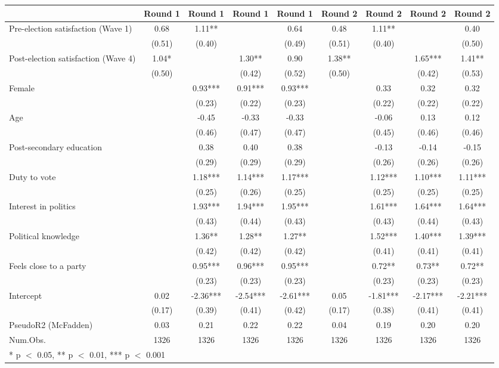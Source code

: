 \begin{table}
\centering
\begin{tabular}[t]{lcccccccc}
\toprule
  & Round 1 & Round 1  & Round 1   & Round 1    & Round 2 & Round 2  & Round 2   & Round 2   \\
\midrule
Pre-election satisfaction (Wave 1) & 0.68 & 1.11** &  & 0.64 & 0.48 & 1.11** &  & 0.40\\
 & (0.51) & (0.40) &  & (0.49) & (0.51) & (0.40) &  & (0.50)\\
Post-election satisfaction (Wave 4) & 1.04* &  & 1.30** & 0.90 & 1.38** &  & 1.65*** & 1.41**\\
 & (0.50) &  & (0.42) & (0.52) & (0.50) &  & (0.42) & (0.53)\\
Female &  & 0.93*** & 0.91*** & 0.93*** &  & 0.33 & 0.32 & 0.32\\
 &  & (0.23) & (0.22) & (0.23) &  & (0.22) & (0.22) & (0.22)\\
Age &  & -0.45 & -0.33 & -0.33 &  & -0.06 & 0.13 & 0.12\\
 &  & (0.46) & (0.47) & (0.47) &  & (0.45) & (0.46) & (0.46)\\
Post-secondary education &  & 0.38 & 0.40 & 0.38 &  & -0.13 & -0.14 & -0.15\\
 &  & (0.29) & (0.29) & (0.29) &  & (0.26) & (0.26) & (0.26)\\
Duty to vote &  & 1.18*** & 1.14*** & 1.17*** &  & 1.12*** & 1.10*** & 1.11***\\
 &  & (0.25) & (0.26) & (0.25) &  & (0.25) & (0.25) & (0.25)\\
Interest in politics &  & 1.93*** & 1.94*** & 1.95*** &  & 1.61*** & 1.64*** & 1.64***\\
 &  & (0.43) & (0.44) & (0.43) &  & (0.43) & (0.44) & (0.43)\\
Political knowledge &  & 1.36** & 1.28** & 1.27** &  & 1.52*** & 1.40*** & 1.39***\\
 &  & (0.42) & (0.42) & (0.42) &  & (0.41) & (0.41) & (0.41)\\
Feels close to a party &  & 0.95*** & 0.96*** & 0.95*** &  & 0.72** & 0.73** & 0.72**\\
 &  & (0.23) & (0.23) & (0.23) &  & (0.23) & (0.23) & (0.23)\\
Intercept & 0.02 & -2.36*** & -2.54*** & -2.61*** & 0.05 & -1.81*** & -2.17*** & -2.21***\\
 & (0.17) & (0.39) & (0.41) & (0.42) & (0.17) & (0.38) & (0.41) & (0.41)\\
\midrule
PseudoR2 (McFadden) & 0.03 & 0.21 & 0.22 & 0.22 & 0.04 & 0.19 & 0.20 & 0.20\\
Num.Obs. & 1326 & 1326 & 1326 & 1326 & 1326 & 1326 & 1326 & 1326\\
\bottomrule
\multicolumn{9}{l}{\rule{0pt}{1em}* p $<$ 0.05, ** p $<$ 0.01, *** p $<$ 0.001}\\
\end{tabular}
\end{table}
